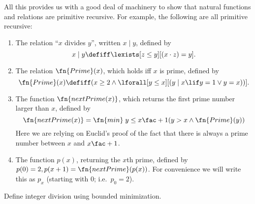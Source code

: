 \documentclass[../../include/open-logic-section]{subfiles}
\begin{document}
All this provides us with a good deal of machinery to show that
natural functions and relations are primitive recursive. For example,
the following are all primitive recursive:
\begin{enumerate}
\item The relation ``$x$ divides $y$'', written $x \mid y$, defined by
\[
x \mid y \defiff \lexists[z \leq y][(x \cdot z) = y].
\]

\item The relation $\fn{Prime}(x)$, which holds iff $x$ is prime,
  defined by
\[
\fn{Prime}(x) \defiff (x \geq 2 \land \lforall[y \leq x][(y \mid x \lif y
  = 1 \lor y = x))].
\]
\item The function $\fn{nextPrime(x)}$, which returns the first prime
  number larger than $x$, defined by
\[
  \fn{nextPrime(x)} = \fn{min} \; {y \leq x\fac+1} \\ (y > x \land \fn{Prime}(y))
\]
Here we are relying on Euclid's proof of the fact that there is always
a prime number between $x$ and $x\fac+1$.

\item The function $p(x)$, returning the $x$th prime, defined by $p(0)
  = 2, p(x+1) = \fn{nextPrime}(p(x))$. For convenience we will write
  this as $p_x$ (starting with 0; i.e.\ $p_0=2$).
\end{enumerate}

\begin{prob}
Define integer division using bounded minimization.
\end{prob}
\end{document}
